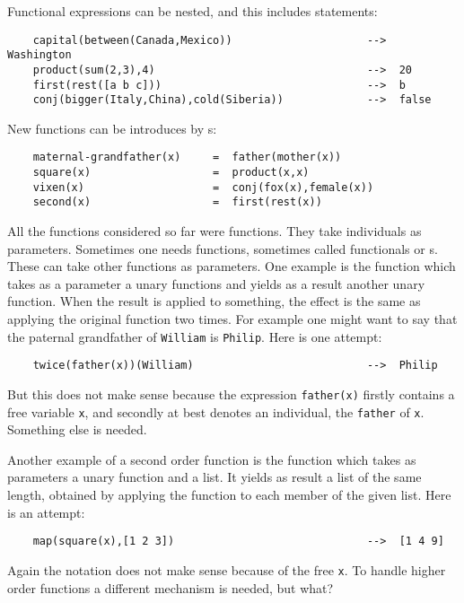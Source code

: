 \par
Functional expressions can be nested, and this includes statements:
\begin{verbatim}
    capital(between(Canada,Mexico))                     -->  Washington
    product(sum(2,3),4)                                 -->  20
    first(rest([a b c]))                                -->  b
    conj(bigger(Italy,China),cold(Siberia))             -->  false
\end{verbatim}
\par
New functions can be introduces by s:
\begin{verbatim}
    maternal-grandfather(x)     =  father(mother(x))
    square(x)                   =  product(x,x)
    vixen(x)                    =  conj(fox(x),female(x))
    second(x)                   =  first(rest(x))
\end{verbatim}
\par
All the functions considered so far were  functions.
They take individuals as parameters.
Sometimes one needs  functions,
sometimes called functionals or s.
These can take other functions as parameters.
One example is the  function
which takes as a parameter a unary functions and yields
as a result another unary function.
When the result is applied to something,
the effect is the same as applying the original function two times.
For example one might want to say that the
paternal grandfather of \verb#William#
is \verb#Philip#.
Here is one attempt:
\begin{verbatim}
    twice(father(x))(William)                           -->  Philip
\end{verbatim}
But this does not make sense because the expression \verb#father(x)#
firstly contains a free variable \verb#x#,
and secondly at best denotes an individual, the \verb#father# of \verb#x#.
Something else is needed.
\par
Another example of a second order function is the  function
which takes as parameters a unary function and a list.
It yields as result a list of the same length,
obtained by applying the function to each member of the given list.
Here is an attempt:
\begin{verbatim}
    map(square(x),[1 2 3])                              -->  [1 4 9]
\end{verbatim}
Again the notation does not make sense because of the free \verb#x#.
To handle higher order functions a different mechanism is needed,
but what?
